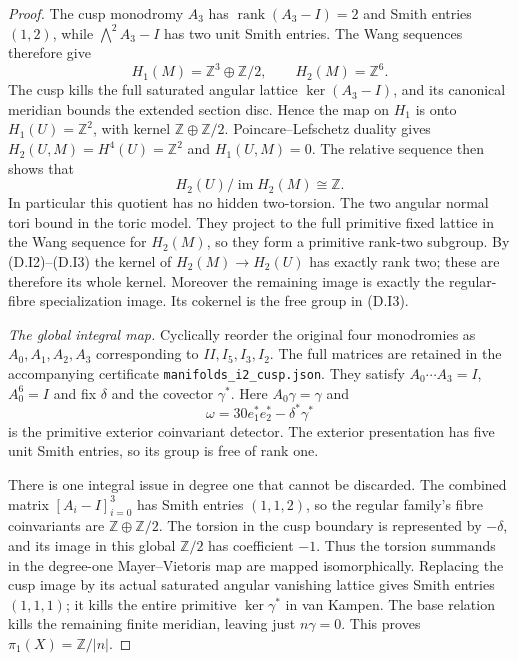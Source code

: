 \begin{proof}
The cusp monodromy $A_3$ has $\operatorname{rank}(A_3-I)=2$
and Smith entries $(1,2)$, while
$\bigwedge^2A_3-I$ has two unit Smith entries.
The Wang sequences therefore give
\[
 H_1(M)=\mathbb Z^3\oplus\mathbb Z/2,
 \qquad H_2(M)=\mathbb Z^6.
\]
The cusp kills the full saturated angular lattice
$\ker(A_3-I)$, and its canonical meridian bounds the
extended section disc. Hence the map on $H_1$ is onto
$H_1(U)=\mathbb Z^2$, with kernel
$\mathbb Z\oplus\mathbb Z/2$.
Poincare--Lefschetz duality gives
$H_2(U,M)=H^4(U)=\mathbb Z^2$ and $H_1(U,M)=0$.
The relative sequence then shows that
\[
 H_2(U)/\operatorname{im}H_2(M)\cong\mathbb Z.
 \tag{D.I3}
\]
In particular this quotient has no hidden two-torsion.
The two angular normal tori bound in the toric model.
They project to the full primitive fixed lattice in the
Wang sequence for $H_2(M)$, so they form a primitive
rank-two subgroup. By (D.I2)--(D.I3) the kernel of
$H_2(M)\to H_2(U)$ has exactly rank two; these are
therefore its whole kernel.
Moreover the remaining image is exactly the regular-fibre
specialization image. Its cokernel is the free group
in (D.I3).

\emph{The global integral map.}
Cyclically reorder the original four monodromies as
$A_0,A_1,A_2,A_3$ corresponding to $II,I_5,I_3,I_2$.
The full matrices are retained in the accompanying certificate
\texttt{manifolds\_i2\_cusp.json}.
They satisfy $A_0\cdots A_3=I$, $A_0^6=I$ and
fix $\delta$ and the covector $\gamma^*$.
Here $A_0\gamma=\gamma$ and
\[
 \omega=30e_1^*e_2^*-\delta^*\gamma^*
\]
is the primitive exterior coinvariant detector.
The exterior presentation has five unit Smith entries,
so its group is free of rank one.

There is one integral issue in degree one that cannot be
discarded. The combined matrix $[A_i-I]_{i=0}^3$ has
Smith entries $(1,1,2)$, so the regular family's fibre
coinvariants are $\mathbb Z\oplus\mathbb Z/2$.
The torsion in the cusp boundary is represented by
$-\delta$, and its image in this global $\mathbb Z/2$
has coefficient $-1$. Thus the torsion summands in
the degree-one Mayer--Vietoris map are mapped
isomorphically. Replacing the cusp image by its actual
saturated angular vanishing lattice gives Smith entries
$(1,1,1)$; it kills the entire primitive
$\ker\gamma^*$ in van Kampen. The base relation kills
the remaining finite meridian, leaving just
$n\gamma=0$. This proves $\pi_1(X)=\mathbb Z/|n|$.


\end{proof}

